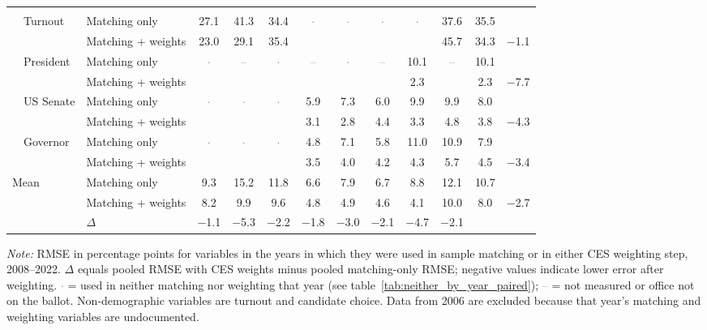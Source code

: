 \begin{table}[!htbp]
{\begin{threeparttable}
\begin{tabular}{llcccccccccc}
\addlinespace[0.3em]
\multicolumn{12}{l}{Non-demographic} \\
\addlinespace[0.1em]
~~Turnout & Matching only & 27.1 & 41.3 & 34.4 & \textcolor{gray}{$\cdot$} & \textcolor{gray}{$\cdot$} & \textcolor{gray}{$\cdot$} & \textcolor{gray}{$\cdot$} & 37.6 & 35.5 & \\
 & Matching + weights & 23.0 & 29.1 & 35.4 &  &  &  &  & 45.7 & 34.3 & $-$1.1 \\
\addlinespace[0.1em]
~~President & Matching only & \textcolor{gray}{$\cdot$} & \textcolor{gray}{--} & \textcolor{gray}{$\cdot$} & \textcolor{gray}{--} & \textcolor{gray}{$\cdot$} & \textcolor{gray}{--} & 10.1 & \textcolor{gray}{--} & 10.1 & \\
 & Matching + weights &  &  &  &  &  &  & 2.3 &  & 2.3 & $-$7.7 \\
\addlinespace[0.1em]
~~US Senate & Matching only & \textcolor{gray}{$\cdot$} & \textcolor{gray}{$\cdot$} & \textcolor{gray}{$\cdot$} & 5.9 & 7.3 & 6.0 & 9.9 & 9.9 & 8.0 & \\
 & Matching + weights &  &  &  & 3.1 & 2.8 & 4.4 & 3.3 & 4.8 & 3.8 & $-$4.3 \\
\addlinespace[0.1em]
~~Governor & Matching only & \textcolor{gray}{$\cdot$} & \textcolor{gray}{$\cdot$} & \textcolor{gray}{$\cdot$} & 4.8 & 7.1 & 5.8 & 11.0 & 10.9 & 7.9 & \\
 & Matching + weights &  &  &  & 3.5 & 4.0 & 4.2 & 4.3 & 5.7 & 4.5 & $-$3.4 \\
\midrule
Mean\tnote{b} & Matching only & 9.3 & 15.2 & 11.8 & 6.6 & 7.9 & 6.7 & 8.8 & 12.1 & 10.7 & \\
 & Matching + weights & 8.2 & 9.9 & 9.6 & 4.8 & 4.9 & 4.6 & 4.1 & 10.0 & 8.0 & $-$2.7 \\
 & $\Delta$ & $-$1.1 & $-$5.3 & $-$2.2 & $-$1.8 & $-$3.0 & $-$2.1 & $-$4.7 & $-$2.1 & & \\
\bottomrule
\end{tabular}
\begin{tablenotes}
\footnotesize
\item \textit{Note:} RMSE in percentage points for variables in the years in which they were used in sample matching or in either CES weighting step, 2008--2022. $\Delta$ equals pooled RMSE with CES weights minus pooled matching-only RMSE; negative values indicate lower error after weighting. \textcolor{gray}{$\cdot$} = used in neither matching nor weighting that year (see table~\ref{tab:neither_by_year_paired}); \textcolor{gray}{--} = not measured or office not on the ballot. Non-demographic variables are turnout and candidate choice. Data from 2006 are excluded because that year's matching and weighting variables are undocumented.

\end{tablenotes}
\end{threeparttable}}
\end{table}
